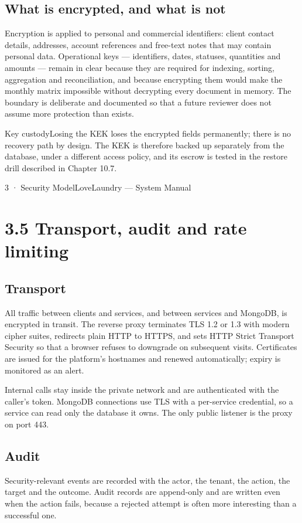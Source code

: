 \documentclass[11pt,a4paper,oneside]{book}
\begin{document}
\subsection*{What is encrypted, and what is not}
Encryption is applied to personal and commercial identifiers: client contact details, addresses, account references and free-text notes that may contain personal data. Operational keys — identifiers, dates, statuses, quantities and amounts — remain in clear because they are required for indexing, sorting, aggregation and reconciliation, and because encrypting them would make the monthly matrix impossible without decrypting every document in memory. The boundary is deliberate and documented so that a future reviewer does not assume more protection than exists.

\begin{notebox}Key custodyLosing the KEK loses the encrypted fields permanently; there is no recovery path by design. The KEK is therefore backed up separately from the database, under a different access policy, and its escrow is tested in the restore drill described in Chapter 10.7.\end{notebox}
3 · Security ModelLoveLaundry — System Manual

\section{3.5 Transport, audit and rate limiting}
\subsection*{Transport}
All traffic between clients and services, and between services and MongoDB, is encrypted in transit. The reverse proxy terminates TLS 1.2 or 1.3 with modern cipher suites, redirects plain HTTP to HTTPS, and sets HTTP Strict Transport Security so that a browser refuses to downgrade on subsequent visits. Certificates are issued for the platform's hostnames and renewed automatically; expiry is monitored as an alert.

Internal calls stay inside the private network and are authenticated with the caller's token. MongoDB connections use TLS with a per-service credential, so a service can read only the database it owns. The only public listener is the proxy on port 443.

\subsection*{Audit}
Security-relevant events are recorded with the actor, the tenant, the action, the target and the outcome. Audit records are append-only and are written even when the action fails, because a rejected attempt is often more interesting than a successful one.
\end{document}
